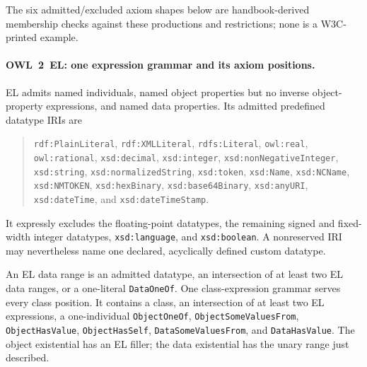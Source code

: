The six admitted/excluded axiom shapes below are handbook-derived membership
checks against these productions and restrictions; none is a W3C-printed
example.

\paragraph{OWL~2~EL: one expression grammar and its axiom positions.}
EL admits named individuals, named object properties but no inverse
object-property expressions, and named data properties.  Its admitted
predefined datatype IRIs are
\begin{quote}\small
\texttt{rdf:PlainLiteral}, \texttt{rdf:XMLLiteral},
\texttt{rdfs:Literal}, \texttt{owl:real}, \texttt{owl:rational},
\texttt{xsd:decimal}, \texttt{xsd:integer},
\texttt{xsd:nonNegativeInteger}, \texttt{xsd:string},
\texttt{xsd:normalizedString}, \texttt{xsd:token}, \texttt{xsd:Name},
\texttt{xsd:NCName}, \texttt{xsd:NMTOKEN}, \texttt{xsd:hexBinary},
\texttt{xsd:base64Binary}, \texttt{xsd:anyURI}, \texttt{xsd:dateTime},
and \texttt{xsd:dateTimeStamp}.
\end{quote}
It expressly excludes the floating-point datatypes, the remaining signed and
fixed-width integer datatypes, \texttt{xsd:language}, and
\texttt{xsd:boolean}.  A nonreserved IRI may nevertheless name one declared,
acyclically defined custom datatype.

An EL data range is an admitted datatype, an intersection of at least two EL
data ranges, or a one-literal \texttt{DataOneOf}.  One class-expression grammar
serves every class position.  It contains a class, an intersection of at least
two EL expressions, a one-individual \texttt{ObjectOneOf},
\texttt{ObjectSomeValuesFrom}, \texttt{ObjectHasValue},
\texttt{ObjectHasSelf}, \texttt{DataSomeValuesFrom}, and
\texttt{DataHasValue}.  The object existential has an EL filler; the data
existential has the unary range just described.

